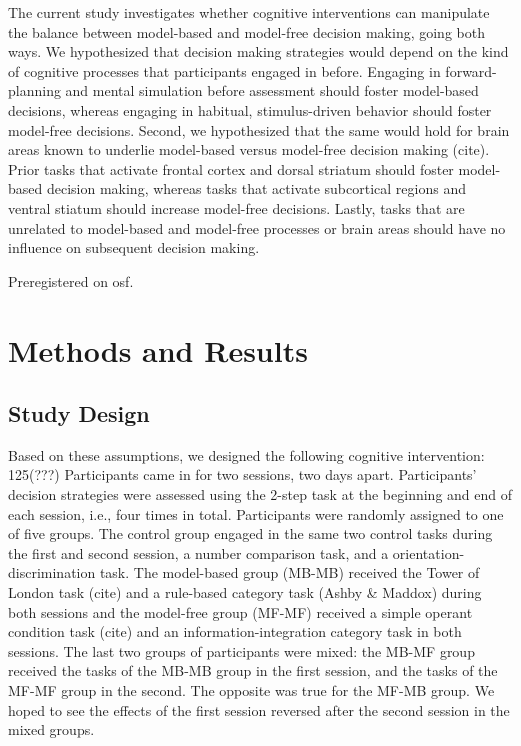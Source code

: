 \documentclass[11pt]{article} %
\begin{document}
The current study investigates whether cognitive interventions can manipulate the balance between model-based and model-free decision making, going both ways. We hypothesized that decision making strategies would depend on the kind of cognitive processes that participants engaged in before. Engaging in forward-planning and mental simulation before assessment should foster model-based decisions, whereas engaging in habitual, stimulus-driven behavior should foster model-free decisions. Second, we hypothesized that the same would hold for brain areas known to underlie model-based versus model-free decision making (cite). Prior tasks that activate frontal cortex and dorsal striatum should foster model-based decision making, whereas tasks that activate subcortical regions and ventral stiatum should increase model-free decisions. Lastly, tasks that are unrelated to model-based and model-free processes or brain areas should have no influence on subsequent decision making.

Preregistered on osf.

\section{Methods and Results}
\subsection{Study Design}

Based on these assumptions, we designed the following cognitive intervention: 125(???) Participants came in for two sessions, two days apart. Participants' decision strategies were assessed using the 2-step task at the beginning and end of each session, i.e., four times in total. Participants were randomly assigned to one of five groups. The control group engaged in the same two control tasks during the first and second session, a number comparison task, and a orientation-discrimination task. The model-based group (MB-MB) received the Tower of London task (cite) and a rule-based category task (Ashby \& Maddox) during both sessions and the model-free group (MF-MF) received a simple operant condition task (cite) and an information-integration category task in both sessions. The last two groups of participants were mixed: the MB-MF group received the tasks of the MB-MB group in the first session, and the tasks of the MF-MF group in the second. The opposite was true for the MF-MB group. We hoped to see the effects of the first session reversed after the second session in the mixed groups.
\end{document}

